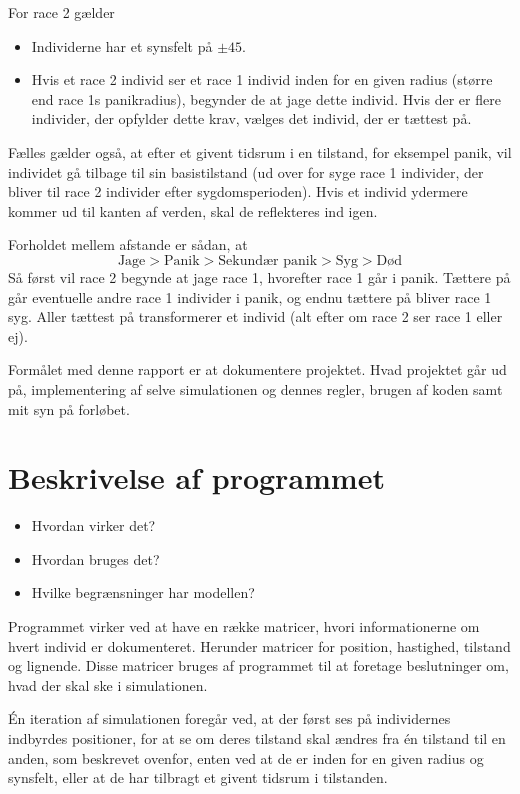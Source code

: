 \documentclass[a4paper,10pt]{article} 	%
\numberwithin{equation}{section}
\begin{document}
	For race 2 gælder
	\begin{itemize}
		\item Individerne har et synsfelt på $ \pm 45 $\Deg.
		\item Hvis et race 2 individ ser et race 1 individ inden for en given radius (større end race 1s panikradius), begynder de at jage dette individ. Hvis der er flere individer, der opfylder dette krav, vælges det individ, der er tættest på.
	\end{itemize}
	Fælles gælder også, at efter et givent tidsrum i en tilstand, for eksempel panik, vil individet gå tilbage til sin basistilstand (ud over for syge race 1 individer, der bliver til race 2 individer efter sygdomsperioden). Hvis et individ ydermere kommer ud til kanten af verden, skal de reflekteres ind igen.
	
	Forholdet mellem afstande er sådan, at 
	\begin{equation*}
		\text{Jage} > \text{Panik} > \text{Sekundær panik} > \text{Syg} > \text{Død}
	\end{equation*}
	Så først vil race 2 begynde at jage race 1, hvorefter race 1 går i panik. Tættere på går eventuelle andre race 1 individer i panik, og endnu tættere på bliver race 1 syg. Aller tættest på transformerer et individ (alt efter om race 2 ser race 1 eller ej).
	
	
	Formålet med denne rapport er at dokumentere projektet. Hvad projektet går ud på, implementering af selve simulationen og dennes regler, brugen af koden samt mit syn på forløbet.
	
	
	\section{Beskrivelse af programmet}
	\begin{itemize}
		\item Hvordan virker det?
		\item Hvordan bruges det?
		\item Hvilke begrænsninger har modellen?
	\end{itemize}
	Programmet virker ved at have en række matricer, hvori informationerne om hvert individ er dokumenteret. Herunder matricer for position, hastighed, tilstand og lignende. Disse matricer bruges af programmet til at foretage beslutninger om, hvad der skal ske i simulationen. 
	
	Én iteration af simulationen foregår ved, at der først ses på individernes indbyrdes positioner, for at se om deres tilstand skal ændres fra én tilstand til en anden, som beskrevet ovenfor, enten ved at de er inden for en given radius og synsfelt, eller at de har tilbragt et givent tidsrum i tilstanden.
	
\end{document}
